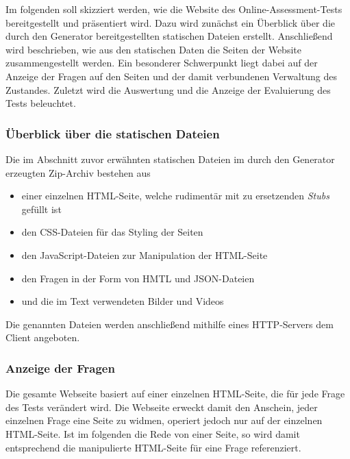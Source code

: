\label{Jena}

Im folgenden soll skizziert werden, wie die Website des Online-Assessment-Tests bereitgestellt und präsentiert wird. Dazu wird zunächst ein Überblick über die durch den Generator bereitgestellten statischen Dateien erstellt. Anschließend wird beschrieben, wie aus den statischen Daten die Seiten der Website zusammengestellt werden. Ein besonderer Schwerpunkt liegt dabei auf der Anzeige der Fragen auf den Seiten und der damit verbundenen Verwaltung des Zustandes. Zuletzt wird die Auswertung und die Anzeige der Evaluierung des Tests beleuchtet.

\subsubsection{Überblick über die statischen Dateien}

Die im Abschnitt zuvor erwähnten statischen Dateien im durch den Generator erzeugten Zip-Archiv bestehen aus

\begin{itemize}
\item einer einzelnen HTML-Seite, welche rudimentär mit zu ersetzenden \textit{Stubs} gefüllt ist

\item den CSS-Dateien für das Styling der Seiten

\item den JavaScript-Dateien zur Manipulation der HTML-Seite 

\item den Fragen in der Form von HMTL und JSON-Dateien

\item und die im Text verwendeten Bilder und Videos
\end{itemize}

Die genannten Dateien werden anschließend mithilfe eines HTTP-Servers dem Client angeboten. 

\subsubsection{Anzeige der Fragen}

Die gesamte Webseite basiert auf einer einzelnen HTML-Seite, die für jede Frage des Tests verändert wird. Die Webseite erweckt damit den Anschein, jeder einzelnen Frage eine Seite zu widmen, operiert jedoch nur auf der einzelnen HTML-Seite. Ist im folgenden die Rede von einer Seite, so wird damit entsprechend die manipulierte HTML-Seite für eine Frage referenziert.

